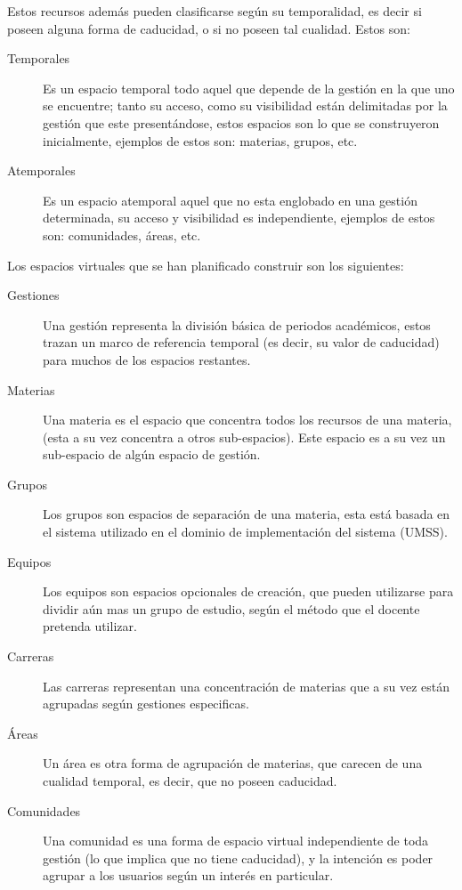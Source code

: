 Estos recursos además pueden clasificarse según su temporalidad, es decir si
poseen alguna forma de caducidad, o si no poseen tal cualidad. Estos son:

\begin{description}
\item [Temporales] Es un espacio temporal todo aquel que depende de la gestión
en la que uno se encuentre; tanto su acceso, como su visibilidad están
delimitadas por la gestión que este presentándose, estos espacios son lo que se
construyeron inicialmente, ejemplos de estos son: materias, grupos, etc.
\item [Atemporales] Es un espacio atemporal aquel que no esta englobado en una
gestión determinada, su acceso y visibilidad es independiente, ejemplos de
estos son: comunidades, áreas, etc.
\end{description}

Los espacios virtuales que se han planificado construir son los siguientes:

\begin{description}
\item [Gestiones] Una gestión representa la división básica de periodos
académicos, estos trazan un marco de referencia temporal (es decir, su valor de
caducidad) para muchos de los espacios restantes.
\item [Materias] Una materia es el espacio que concentra todos los recursos de
una materia, (esta a su vez concentra a otros sub-espacios). Este espacio es a
su vez un sub-espacio de algún espacio de gestión.
\item [Grupos] Los grupos son espacios de separación de una materia, esta está
basada en el sistema utilizado en el dominio de implementación del sistema
(UMSS).
\item [Equipos] Los equipos son espacios opcionales de creación, que pueden
utilizarse para dividir aún mas un grupo de estudio, según el método que el
docente pretenda utilizar.
\item [Carreras] Las carreras representan una concentración de materias que a su
vez están agrupadas según gestiones especificas.
\item [Áreas] Un área es otra forma de agrupación de materias, que carecen de
una cualidad temporal, es decir, que no poseen caducidad.
\item [Comunidades] Una comunidad es una forma de espacio virtual independiente
de toda gestión (lo que implica que no tiene caducidad), y la intención es poder
agrupar a los usuarios según un interés en particular.
\end{description}

